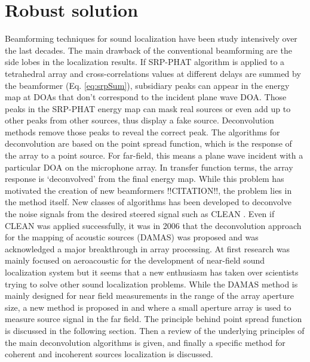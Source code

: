 \section{Robust solution}

Beamforming techniques for sound localization have been study intensively over the last decades. The main drawback of the conventional beamforming are the side lobes in the localization results. If SRP-PHAT algorithm is applied to a tetrahedral array and cross-correlations values at different delays are summed by the beamformer (Eq. \ref{eq:srpSum}), subsidiary peaks can appear in the energy map at DOAs that don't correspond to the incident plane wave DOA. Those peaks in the SRP-PHAT energy map can mask real sources or even add up to other peaks from other sources, thus display a fake source. Deconvolution methods remove those peaks to reveal the correct peak. The algorithms for deconvolution are based on the point spread function, which is the response of the array to a point source. For far-field, this means a plane wave incident with a particular DOA on the microphone array. In transfer function terms, the array response is `deconvolved' from the final energy map. While this problem has motivated the creation of new beamformers {!!CITATION!!}, the problem lies in the method itself. New classes of algorithms has been developed to deconvolve the noise signals from the desired steered signal such as CLEAN \cite{sijtsma2007clean}. Even if CLEAN was applied successfully, it was in 2006 that the deconvolution approach for the mapping of acoustic sources (DAMAS) was proposed \cite{brooks2006deconvolution} and was acknowledged a major breakthrough in array processing. At first research was mainly focused on aeroacoustic for the development of near-field sound localization system but it seems that a new enthusiasm has taken over scientists trying to solve other sound localization problems. While the DAMAS method is mainly designed for near field measurements in the range of the array aperture size, a new method is proposed in \cite{zhao2015large} and \cite{zhao2017large} where a small aperture array is used to measure source signal in the far field. The principle behind point spread function is discussed in the following section. Then a review of the underlying principles of the main deconvolution algorithms is given, and finally a specific method for coherent and incoherent sources localization is discussed.

